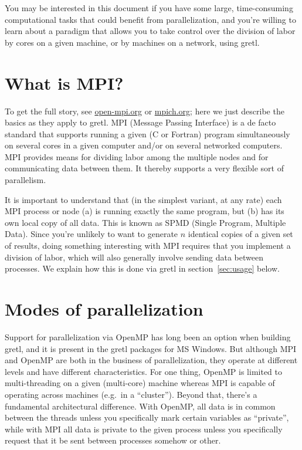 \documentclass{article}
\begin{document}
You may be interested in this document if you have some large,
time-consuming computational tasks that could benefit from
parallelization, and you're willing to learn about a paradigm that
allows you to take control over the division of labor by cores on a
given machine, or by machines on a network, using gretl.

\section{What is MPI?}
\label{sec:MPI}

To get the full story, see \url{open-mpi.org} or \url{mpich.org}; here
we just describe the basics as they apply to gretl. MPI (Message
Passing Interface) is a de facto standard that supports running a
given (C or Fortran) program simultaneously on several cores in a
given computer and/or on several networked computers. MPI provides
means for dividing labor among the multiple nodes and for
communicating data between them. It thereby supports a very flexible
sort of parallelism.

It is important to understand that (in the simplest variant, at any
rate) each MPI process or node (a) is running exactly the same
program, but (b) has its own local copy of all data. This is known as
SPMD (Single Program, Multiple Data). Since you're unlikely to want to
generate $n$ identical copies of a given set of results, doing
something interesting with MPI requires that you implement a division
of labor, which will also generally involve sending data between
processes. We explain how this is done via gretl in
section~\ref{sec:usage} below.

\section{Modes of parallelization}
\label{sec:MPI-OMP}

Support for parallelization via \textsf{OpenMP} has long been an
option when building gretl, and it is present in the gretl packages
for MS Windows. But although MPI and \textsf{OpenMP} are both in the
business of parallelization, they operate at different levels and have
different characteristics. For one thing, \textsf{OpenMP} is limited
to multi-threading on a given (multi-core) machine whereas MPI is
capable of operating across machines (e.g.\ in a ``cluster''). Beyond
that, there's a fundamental architectural difference. With
\textsf{OpenMP}, all data is in common between the threads unless you
specifically mark certain variables as ``private'', while with MPI all
data is private to the given process unless you specifically request
that it be sent between processes somehow or other.
\end{document}
